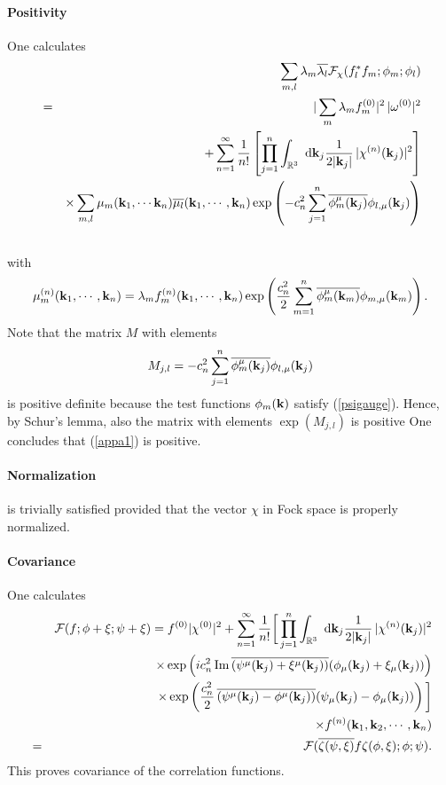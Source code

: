 \documentclass[12pt,a4paper]{article}
\def\Ro{{\mathbb R}}
\def\kk{{\bf k}}
\renewcommand{\Im}{\,{\rm Im}\,}
\begin{document}
\paragraph{Positivity}
One calculates
\begin{eqnarray}
& &\sum_{m,l}\lambda_m\overline{\lambda_l}{\cal F}_\chi(f^*_lf_m;\phi_m;\phi_l)\cr
&=&|\sum_m\lambda_mf_m^{(0)}|^2\,|\omega^{(0)}|^2\cr
& &+
\sum_{n=1}^\infty\frac{1}{n!}\left[\prod_{j=1}^n\int_{\Ro^3}\hbox{ d}\kk_j
\frac{1}{2|\kk_j|}\,|\chi^{(n)}(\kk_j)|^2\right]\cr
& &\times
\sum_{m,l}\mu_m(\kk_1,\cdots\kk_n)\overline{\mu_l}(\kk_1,\cdots,\kk_n)
\exp\left(-c_n^2\sum_{j=1}^n\overline{\phi_m^\mu(\kk_j)}\phi_{l,\mu}(\kk_j)\right)\cr
& &
\label{appa1}
\end{eqnarray}
with
\begin{equation}
\mu_m^{(n)}(\kk_1,\cdots,\kk_n)
=\lambda_m
f_m^{(n)}(\kk_1,\cdots,\kk_n)
\exp\left(\frac{c_n^2}{2}\sum_{m=1}^n\overline{\phi_m^\mu(\kk_m)}\phi_{m,\mu}(\kk_m)\right).
\end{equation}
Note that the matrix $M$ with elements
\begin{equation}
M_{j,l}=-c_n^2\sum_{j=1}^n\overline{\phi_m^\mu(\kk_j)}\phi_{l,\mu}(\kk_j)
\end{equation}
is positive definite because the test functions $\phi_m(\kk)$ satisfy
(\ref{psigauge}). Hence, by Schur's lemma, also the matrix with
elements $\exp(M_{j,l})$ is positive  One concludes
that (\ref{appa1}) is positive.

\paragraph{Normalization}
is trivially satisfied provided that the vector $\chi$ in Fock space is
properly normalized.

\paragraph{Covariance}
One calculates
\begin{eqnarray}
& &{\cal F}(f;\phi+\xi;\psi+\xi)
=f^{(0)}|\chi^{(0)}|^2
+\sum_{n=1}^\infty\frac{1}{n!}\bigg[\prod_{j=1}^n\int_{\Ro^3}\hbox{ d}\kk_j
\frac{1}{2|\kk_j|}\,|\chi^{(n)}(\kk_j)|^2\cr
& &\times
\exp\left(ic_n^2\Im\overline{( \psi^\mu(\kk_j)+\xi^\mu(\kk_j))}
(\phi_\mu(\kk_j)+\xi_\mu(\kk_j))
\right)\cr
& &\times\exp\left(
\frac{c_n^2}{2}\,\overline{( \psi^\mu(\kk_j)-\phi^\mu(\kk_j))}
(\psi_\mu(\kk_j)-\phi_\mu(\kk_j))
\right)
\bigg]\cr
& &\times f^{(n)}(\kk_1,\kk_2,\cdots,\kk_n)\cr
&=&{\cal F}(\overline{\zeta(\psi,\xi)}f\zeta(\phi,\xi);\phi;\psi).
\end{eqnarray}
This proves covariance of the correlation functions.
\end{document}
